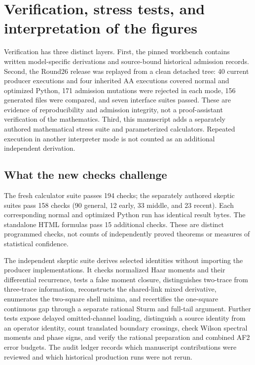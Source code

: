 \section{Verification, stress tests, and interpretation of the figures}
\label{sec:verification}

Verification has three distinct layers. First, the pinned workbench contains written model-specific derivations and source-bound historical admission records. Second, the Round26 release was replayed from a clean detached tree: 40 current producer executions and four inherited AA executions covered normal and optimized Python, 171 admission mutations were rejected in each mode, 156 generated files were compared, and seven interface suites passed. These are evidence of reproducibility and admission integrity, not a proof-assistant verification of the mathematics. Third, this manuscript adds a separately authored mathematical stress suite and parameterized calculators. Repeated execution in another interpreter mode is not counted as an additional independent derivation.

\subsection{What the new checks challenge}
The fresh calculator suite passes 194 checks; the separately authored skeptic suites pass 158 checks (90 general, 12 early, 33 middle, and 23 recent). Each corresponding normal and optimized Python run has identical result bytes. The standalone HTML formulas pass 15 additional checks. These are distinct programmed checks, not counts of independently proved theorems or measures of statistical confidence.

The independent skeptic suite derives selected identities without importing the producer implementations. It checks normalized Haar moments and their differential recurrence, tests a false moment closure, distinguishes two-trace from three-trace information, reconstructs the shared-link mixed derivative, enumerates the two-square shell minima, and recertifies the one-square continuous gap through a separate rational Sturm and full-tail argument. Further tests expose delayed omitted-channel loading, distinguish a source identity from an operator identity, count translated boundary crossings, check Wilson spectral moments and phase signs, and verify the rational preparation and combined AF2 error budgets. The audit ledger records which manuscript contributions were reviewed and which historical production runs were not rerun.

